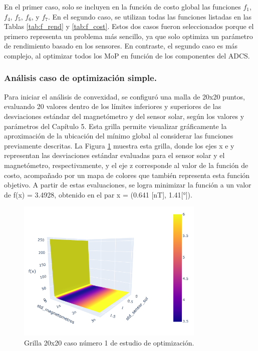 En el primer caso, solo se incluyen en la función de costo global las funciones $f_1$, $f_4$, $f_5$, $f_6$, y $f_7$. En el segundo caso, se utilizan todas las funciones listadas en las Tablas \ref{tab:f_rend} y \ref{tab:f_cost}. Estos dos casos fueron seleccionados porque el primero representa un problema más sencillo, ya que solo optimiza un parámetro de rendimiento basado en los sensores. En contraste, el segundo caso es más complejo, al optimizar todos los MoP en función de los componentes del ADCS.

\subsubsection{Análisis caso de optimización simple.}

Para iniciar el análisis de convexidad, se configuró una malla de 20x20 puntos, evaluando 20 valores dentro de los límites inferiores y superiores de las desviaciones estándar del magnetómetro y del sensor solar, según los valores y parámetros del Capítulo 5. Esta grilla permite visualizar gráficamente la aproximación de la ubicación del mínimo global al considerar las funciones previamente descritas. La Figura \ref{fig:f_grilla3d} muestra esta grilla, donde los ejes x e y representan las desviaciones estándar evaluadas para el sensor solar y el magnetómetro, respectivamente, y el eje z corresponde al valor de la función de costo, acompañado por un mapa de colores que también representa esta función objetivo. A partir de estas evaluaciones, se logra minimizar la función a un valor de f(x) = 3.4928, obtenido en el par x = (0.641 [nT], 1.41[°]).

\begin{figure}[h!]
	\centering    
	\includegraphics[width=0.8\textwidth]{SAboth0_typeact0_typerendacc.png}
	\caption{Grilla 20x20 caso número 1 de estudio de optimización.}
	\label{fig:f_grilla3d}
\end{figure}	

